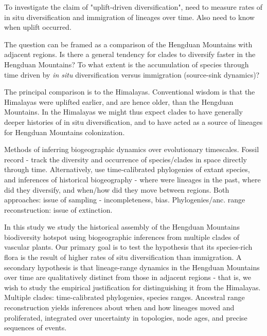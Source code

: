 To investigate the claim of "uplift-driven diversification", need to measure rates of in situ diversification and immigration of lineages over time. Also need to know when uplift occurred.

The question can be framed as a comparison of the Hengduan Mountains with adjacent regions. Is there a general tendency for clades to diversify faster in the Hengduan Mountains? To what extent is the accumulation of species through time driven by \textit{in situ} diversification versus immigration (source-sink dynamics)?

The principal comparison is to the Himalayas. Conventional wisdom is that the Himalayas were uplifted earlier, and are hence older, than the Hengduan Mountains. In the Himalayas we might thus expect clades to have generally deeper histories of in situ diversification, and to have acted as a source of lineages for Hengduan Mountains colonization.

Methods of inferring biogeographic dynamics over evolutionary timescales. Fossil record - track the diversity and occurrence of species/clades in space directly through time. Alternatively, use time-calibrated phylogenies of extant species, and inferences of historical biogeography - where were lineages in the past, where did they diversify, and when/how did they move between regions. Both approaches: issue of sampling - incompleteness, bias. Phylogenies/anc. range reconstruction: issue of extinction.

In this study we study the historical assembly of the Hengduan Mountains biodiversity hotspot using biogeographic inferences from multiple clades of vascular plants. Our primary goal is to test the hypothesis that its species-rich flora is the result of higher rates of situ diversification than immigration. A secondary hypothesis is that lineage-range dynamics in the Hengduan Mountains over time are qualitatively distinct from those in adjacent regions - that is, we wish to study the empirical justification for distinguishing it from the Himalayas. Multiple clades: time-calibrated phylogenies, species ranges. Ancestral range reconstruction yields inferences about when and how lineages moved and proliferated, integrated over uncertainty in topologies, node ages, and precise sequences of events.
